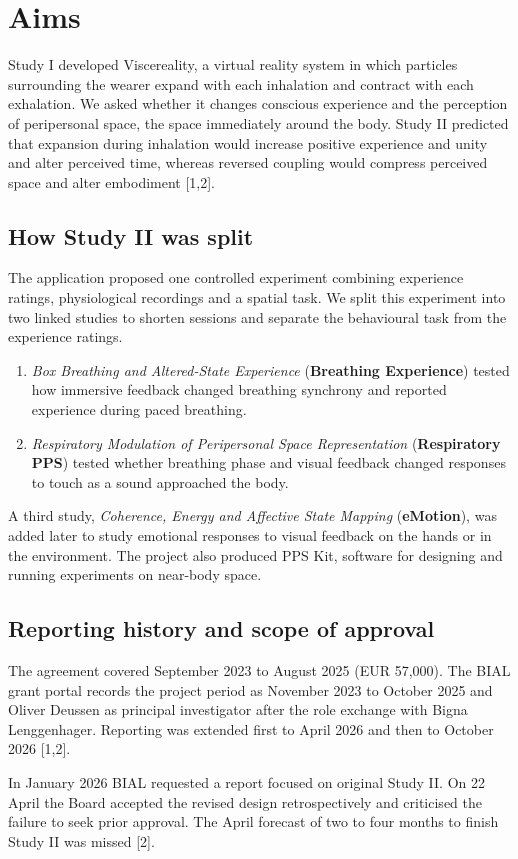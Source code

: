 \section{Aims}
\label{sec:aims}
Study I developed Viscereality, a virtual reality system in which particles surrounding the wearer expand with each inhalation and contract with each exhalation. We asked whether it changes conscious experience and the perception of peripersonal space, the space immediately around the body. Study II predicted that expansion during inhalation would increase positive experience and unity and alter perceived time, whereas reversed coupling would compress perceived space and alter embodiment [1,2].

\subsection{How Study II was split}
The application proposed one controlled experiment combining experience ratings, physiological recordings and a spatial task. We split this experiment into two linked studies to shorten sessions and separate the behavioural task from the experience ratings.

\begin{enumerate}
\setlength{\itemsep}{1pt}
\item \emph{Box Breathing and Altered-State Experience} (\textbf{Breathing Experience}) tested how immersive feedback changed breathing synchrony and reported experience during paced breathing.
\item \emph{Respiratory Modulation of Peripersonal Space Representation} (\textbf{Respiratory PPS}) tested whether breathing phase and visual feedback changed responses to touch as a sound approached the body.
\end{enumerate}

A third study, \emph{Coherence, Energy and Affective State Mapping} (\textbf{eMotion}), was added later to study emotional responses to visual feedback on the hands or in the environment. The project also produced PPS Kit, software for designing and running experiments on near-body space.

\subsection{Reporting history and scope of approval}
The agreement covered September 2023 to August 2025 (EUR 57,000). The BIAL grant portal records the project period as November 2023 to October 2025 and Oliver Deussen as principal investigator after the role exchange with Bigna Lenggenhager. Reporting was extended first to April 2026 and then to October 2026 [1,2].

In January 2026 BIAL requested a report focused on original Study II. On 22 April the Board accepted the revised design retrospectively and criticised the failure to seek prior approval. The April forecast of two to four months to finish Study II was missed [2].
